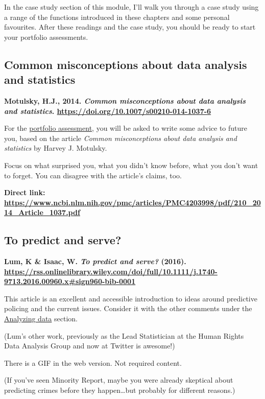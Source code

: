 \documentclass[
  openany]{book}
\begin{document}
In the case study section of this module, I'll walk you through a case study using a range of the functions introduced in these chapters and some personal favourites. After these readings and the case study, you should be ready to start your portfolio assessments.

\hypertarget{common-misconceptions-about-data-analysis-and-statistics}{%
\subsection{Common misconceptions about data analysis and statistics}\label{common-misconceptions-about-data-analysis-and-statistics}}

\textbf{Motulsky, H.J., 2014. \emph{Common misconceptions about data analysis and statistics}. \url{https://doi.org/10.1007/s00210-014-1037-6}}

For the \protect\hyperlink{portfolio}{portfolio assessment}, you will be asked to write some advice to future you, based on the article \emph{Common misconceptions about data analysis and statistics} by Harvey J. Motulsky.

Focus on what surprised you, what you didn't know before, what you don't want to forget. You can disagree with the article's claims, too.

\textbf{Direct link: \url{https://www.ncbi.nlm.nih.gov/pmc/articles/PMC4203998/pdf/210_2014_Article_1037.pdf}}

\hypertarget{to-predict-and-serve}{%
\subsection{To predict and serve?}\label{to-predict-and-serve}}

\textbf{Lum, K \& Isaac, W. \emph{To predict and serve?} (2016). \url{https://rss.onlinelibrary.wiley.com/doi/full/10.1111/j.1740-9713.2016.00960.x\#sign960-bib-0001}}

This article is an excellent and accessible introduction to ideas around predictive policing and the current issues. Consider it with the other comments under the \protect\hyperlink{analyzingethics}{Analyzing data} section.

(Lum's other work, previously as the Lead Statistician at the Human Rights Data Analysis Group and now at Twitter is awesome!)

There is a GIF in the web version. Not required content.

(If you've seen Minority Report, maybe you were already skeptical about predicting crimes before they happen\ldots but probably for different reasons.)
\end{document}
